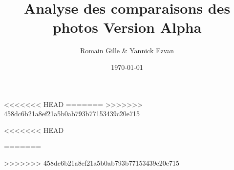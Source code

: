 



\title{Analyse des comparaisons des photos Version Alpha}
\author{Romain Gille \& Yannick Ezvan}
\date{\today}
\maketitle
<<<<<<< HEAD
{
    \hypersetup{linkbordercolor=gray}
    \tableofcontents
}
=======
\tableofcontents
>>>>>>> 458dc6b21a8ef21a5b0ab793b77153439c20e715

\newpage

\newpage

\newpage

\newpage

\newpage

\newpage

\newpage

\newpage

\newpage

\newpage

\newpage

\newpage


<<<<<<< HEAD

=======

>>>>>>> 458dc6b21a8ef21a5b0ab793b77153439c20e715

